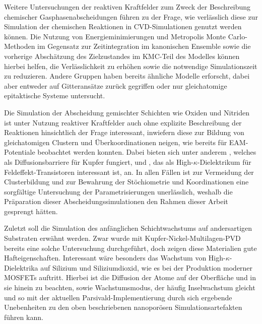 Weitere Untersuchungen der reaktiven Kraftfelder zum Zweck der Beschreibung chemischer Gasphasenabscheidungen führen zu der Frage, wie verlässlich diese zur Simulation der chemischen Reaktionen in CVD-Simulationen genutzt werden können.
Die Nutzung von Energieminimierungen und Metropolis Monte Carlo-Methoden im Gegensatz zur Zeitintegration im kanonischen Ensemble sowie die vorherige Abschätzung des Zielzustandes im KMC-Teil des Modelles können hierbei helfen, die Verlässlichkeit zu erhöhen sowie die notwendige Simulationszeit zu reduzieren.
Andere Gruppen haben bereits ähnliche Modelle erforscht, dabei aber entweder auf Gitteransätze zurück gegriffen\cite{stamatakis_graph-theoretical_2011} oder nur gleichatomige epitaktische Systeme untersucht\cite{clark_hybrid_1996}.

Die Simulation der Abscheidung gemischter Schichten wie Oxiden und Nitriden ist unter Nutzung reaktiver Kraftfelder auch ohne explizite Beschreibung der Reaktionen hinsichtlich der Frage interessant, inwiefern diese zur Bildung von gleichatomigen Clustern und Überkoordinationen neigen, wie bereits für EAM-Potentiale beobachtet werden konnten\cite{lorenz_entwicklung_2012}.
Dabei bieten sich unter anderem , welches als Diffusionsbarriere für Kupfer fungiert, und , das als High-$\kappa$-Dielektrikum für Feldeffekt-Transistoren interessant ist, an.
In allen Fällen ist zur Vermeidung der Clusterbildung und zur Bewahrung der Stöchiometrie und Koordinationen eine sorgfältige Untersuchung der Parametrisierungen unerlässlich, weshalb die Präparation dieser Abscheidungssimulationen den Rahmen dieser Arbeit gesprengt hätten.

Zuletzt soll die Simulation des anfänglichen Schichtwachstums auf andersartigen Substraten erwähnt werden.
Zwar wurde mit Kupfer-Nickel-Multilagen-PVD bereits eine solche Untersuchung durchgeführt, doch zeigen diese Materialien gute Hafteigenschaften.
Interessant wäre besonders das Wachstum von High-$\kappa$-Dielektrika auf Silizium und Siliziumdioxid, wie es bei der Produktion moderner MOSFETs auftritt.
Hierbei ist die Diffusion der Atome auf der Oberfläche und in sie hinein zu beachten, sowie Wachstumsmodus, der häufig Inselwachstum gleicht und so mit der aktuellen Parsivald-Implementierung durch sich ergebende Unebenheiten zu den oben beschriebenen nanoporösen Simulationsartefakten führen kann.

\vspace{0.5em}

